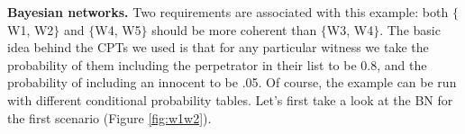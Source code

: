 \documentclass[
  10pt,
]{scrartcl}
\begin{document}
\textbf{Bayesian networks.} Two requirements are associated with this example: both \(\{\)\textsf{W1, W2}\(\}\) and \(\{\)\textsf{W4, W5}\(\}\) should be more coherent than \(\{\)\textsf{W3, W4}\(\}\). The basic idea behind the CPTs we used is that for any particular witness we take the probability of them including the perpetrator in their list to be 0.8, and the probability of including an innocent to be .05. Of course, the example can be run with different conditional probability tables. Let's first take a look at the BN for the first scenario (Figure \ref{fig:w1w2}).

\vspace{1mm}
\footnotesize

\normalsize

\begin{figure}[H]
\scalebox{1.2}{
\hspace{1cm}\begin{subfigure}[!ht]{0.4\textwidth}


\end{subfigure}}
\end{figure}
\end{document}
